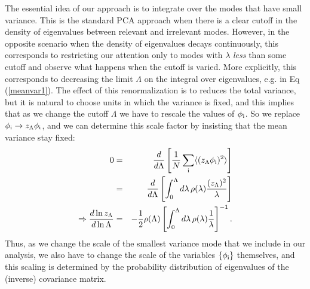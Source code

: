 \documentclass[aps,twocolumn,floats,nofootinbib,prl]{revtex4}
\begin{document}
The essential idea of our approach is to integrate over the modes that have small variance.  This is the standard PCA approach when there is a clear cutoff in the density of eigenvalues between relevant and irrelevant modes. However, in the opposite scenario when the density of eigenvalues decays continuously, this corresponds to restricting our attention only to modes with $\lambda$ {\em less} than some cutoff and observe what happens when the cutoff is varied.  More explicitly, this corresponds to decreasing the limit $\Lambda$ on the integral over eigenvalues, e.g. in Eq (\ref{meanvar1}).  The effect of this renormalization is to reduces the total variance, 
but it is natural to choose units in which the variance is fixed, and  this implies that as we change the cutoff $\Lambda$ we have to rescale the values of $\phi_{\rm i}$.  So we  replace $\phi_{\rm i} \rightarrow z_\Lambda \phi_{\rm i}$, and we can determine this scale factor by insisting that the mean variance stay fixed:
\begin{eqnarray}
0 &=& \frac{d}{d\Lambda} \left[ \frac{1}{N}\sum_{\rm i}\langle (z_\Lambda\phi_{\rm i})^2\rangle\right]\\
&=& \frac{d}{d\Lambda} \left[\int_0^\Lambda d\lambda\, \rho(\lambda ) \frac{(z_\Lambda)^2}{\lambda}\right]\\
\Rightarrow \frac{d\ln z_\Lambda}{d\ln \Lambda} &=& - \frac{1}{2} \rho(\Lambda ) \left[ \int_0^\Lambda d\lambda\, \rho(\lambda ) \frac{1}{\lambda}\right]^{-1} \label{eqn:zlambda}.
\end{eqnarray}
Thus, as we change the scale of the smallest variance mode that we include in our analysis, we also have to change the scale of the variables $\{\phi_{\rm i}\}$ themselves, and this scaling is determined by the probability distribution of eigenvalues of the (inverse) covariance matrix.
\end{document}
